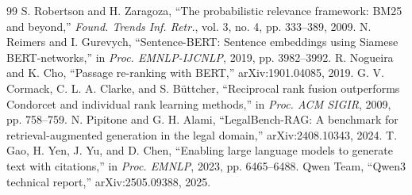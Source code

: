 \documentclass[conference]{IEEEtran}
\begin{document}
\begin{thebibliography}{99}
 S. Robertson and H. Zaragoza, ``The probabilistic relevance framework: BM25 and beyond,'' \textit{Found. Trends Inf. Retr.}, vol. 3, no. 4, pp. 333--389, 2009.
 N. Reimers and I. Gurevych, ``Sentence-BERT: Sentence embeddings using Siamese BERT-networks,'' in \textit{Proc. EMNLP-IJCNLP}, 2019, pp. 3982--3992.
 R. Nogueira and K. Cho, ``Passage re-ranking with BERT,'' arXiv:1901.04085, 2019.
 G. V. Cormack, C. L. A. Clarke, and S. B\"uttcher, ``Reciprocal rank fusion outperforms Condorcet and individual rank learning methods,'' in \textit{Proc. ACM SIGIR}, 2009, pp. 758--759.
 N. Pipitone and G. H. Alami, ``LegalBench-RAG: A benchmark for retrieval-augmented generation in the legal domain,'' arXiv:2408.10343, 2024.
 T. Gao, H. Yen, J. Yu, and D. Chen, ``Enabling large language models to generate text with citations,'' in \textit{Proc. EMNLP}, 2023, pp. 6465--6488.
 Qwen Team, ``Qwen3 technical report,'' arXiv:2505.09388, 2025.
\end{thebibliography}
\end{document}
